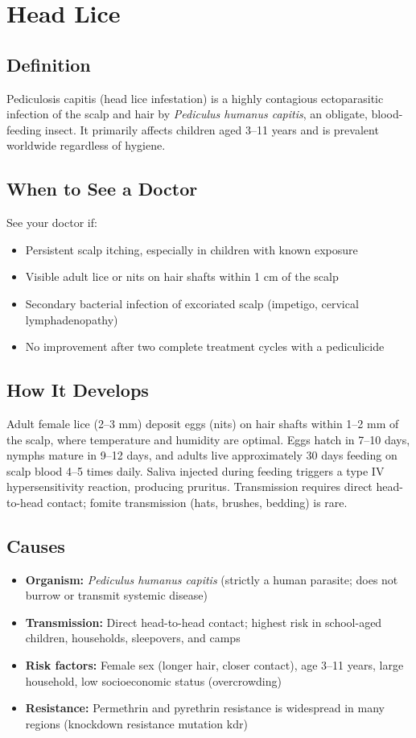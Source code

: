 \chapter{Head Lice}

\section*{Definition}
Pediculosis capitis (head lice infestation) is a highly contagious ectoparasitic infection of the scalp and hair by \textit{Pediculus humanus capitis}, an obligate, blood-feeding insect. It primarily affects children aged 3--11 years and is prevalent worldwide regardless of hygiene.

\section*{When to See a Doctor}
See your doctor if:
\begin{itemize}
  \item Persistent scalp itching, especially in children with known exposure
  \item Visible adult lice or nits on hair shafts within 1 cm of the scalp
  \item Secondary bacterial infection of excoriated scalp (impetigo, cervical lymphadenopathy)
  \item No improvement after two complete treatment cycles with a pediculicide
\end{itemize}

\section*{How It Develops}
Adult female lice (2--3 mm) deposit eggs (nits) on hair shafts within 1--2 mm of the scalp, where temperature and humidity are optimal. Eggs hatch in 7--10 days, nymphs mature in 9--12 days, and adults live approximately 30 days feeding on scalp blood 4--5 times daily. Saliva injected during feeding triggers a type IV hypersensitivity reaction, producing pruritus. Transmission requires direct head-to-head contact; fomite transmission (hats, brushes, bedding) is rare.

\section*{Causes}
\begin{itemize}
  \item \textbf{Organism:} \textit{Pediculus humanus capitis} (strictly a human parasite; does not burrow or transmit systemic disease)
  \item \textbf{Transmission:} Direct head-to-head contact; highest risk in school-aged children, households, sleepovers, and camps
  \item \textbf{Risk factors:} Female sex (longer hair, closer contact), age 3--11 years, large household, low socioeconomic status (overcrowding)
  \item \textbf{Resistance:} Permethrin and pyrethrin resistance is widespread in many regions (knockdown resistance mutation kdr)
\end{itemize}


